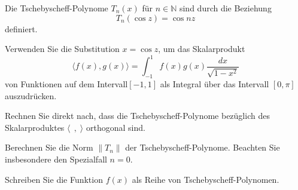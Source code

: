 Die Tschebyscheff-Polynome $T_n(x)$ für $n\in\mathbb{N}$ sind durch
die Beziehung \[
T_n(\cos z) = \cos nz
\]
definiert.
\begin{teilaufgaben}
\item
Verwenden Sie die Substitution $x=\cos z$, um das Skalarprodukt
\[
\langle f(x),g(x)\rangle
=
\int_{-1}^1 f(x)g(x) \frac{dx}{\sqrt{1-x^2}}
\]
von Funktionen auf dem Intervall$[-1,1]$
als Integral über das Intervall $[0,\pi]$ auszudrücken.
\item
Rechnen Sie direkt nach, dass die Tschebyscheff-Polynome bezüglich des
Skalarproduktes
\(
\langle \;\,,\;\rangle
\)
orthogonal sind.
\item
Berechnen Sie die Norm $\|T_n\|$ der Tschebyscheff-Polynome.
Beachten Sie insbesondere den Spezialfall $n=0$.
\item
Schreiben Sie die Funktion $f(x)$ als Reihe von Tschebyscheff-Polynomen.
\end{teilaufgaben}

